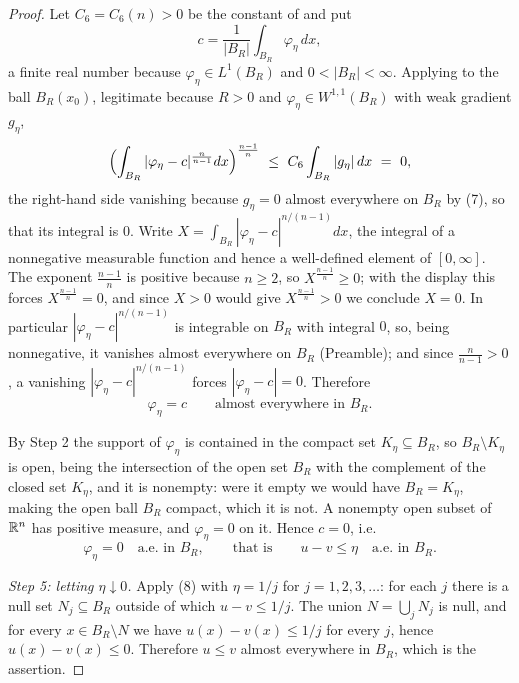 \begin{proof}
Let $C_6=C_6(n)>0$ be the constant of  and put
\[
c=\frac1{|B_R|}\int_{B_R}\varphi_\eta\,dx ,
\]
a finite real number because $\varphi_\eta\in L^1(B_R)$ and $0<|B_R|<\infty$.
Applying  to the ball $B_R(x_0)$, legitimate
because $R>0$ and $\varphi_\eta\in W^{1,1}(B_R)$ with weak gradient $g_\eta$,
\[
\Bigl(\int_{B_R}|\varphi_\eta-c|^{\frac n{n-1}}dx\Bigr)^{\frac{n-1}n}
\ \le\ C_6\int_{B_R}|g_\eta|\,dx\ =\ 0 ,
\]
the right-hand side vanishing because $g_\eta=0$ almost everywhere on $B_R$ by
(7), so that its integral is $0$.  Write
$X=\int_{B_R}|\varphi_\eta-c|^{n/(n-1)}dx$, the integral of a nonnegative
measurable function and hence a well-defined element of $[0,\infty]$.  The
exponent $\frac{n-1}n$ is positive because $n\ge2$, so $X^{\frac{n-1}n}\ge0$;
with the display this forces $X^{\frac{n-1}n}=0$, and since $X>0$ would give
$X^{\frac{n-1}n}>0$ we conclude $X=0$.  In particular
$|\varphi_\eta-c|^{n/(n-1)}$ is integrable on $B_R$ with integral $0$, so, being
nonnegative, it vanishes almost everywhere on $B_R$ (Preamble); and since
$\frac n{n-1}>0$, a vanishing $|\varphi_\eta-c|^{n/(n-1)}$ forces
$|\varphi_\eta-c|=0$.  Therefore
\[
\varphi_\eta=c\qquad\text{almost everywhere in }B_R .
\]

By Step 2 the support of $\varphi_\eta$ is contained in
the compact set $K_\eta\subseteq B_R$, so $B_R\setminus K_\eta$ is open, being
the intersection of the open set $B_R$ with the complement of the closed set
$K_\eta$, and it is nonempty: were it empty we would have $B_R=K_\eta$, making
the open ball $B_R$ compact, which it is not.  A nonempty open subset of $\mathbb{R}^n$
has positive measure, and $\varphi_\eta=0$ on it.  Hence $c=0$, i.e.
\[
\varphi_\eta=0\quad\text{a.e.\ in }B_R,
\qquad\text{that is}\qquad
u-v\le\eta\quad\text{a.e.\ in }B_R .
\tag{8}
\]

\emph{Step 5: letting $\eta\downarrow0$.}  Apply (8) with $\eta=1/j$ for
$j=1,2,3,\dots$: for each $j$ there is a null set $N_j\subseteq B_R$ outside of
which $u-v\le1/j$.  The union $N=\bigcup_jN_j$ is null, and for every
$x\in B_R\setminus N$ we have $u(x)-v(x)\le1/j$ for every $j$, hence
$u(x)-v(x)\le0$.  Therefore $u\le v$ almost everywhere in $B_R$, which is the
assertion.
\end{proof}
